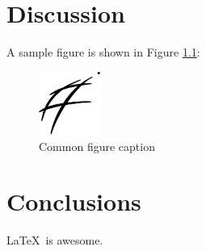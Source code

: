 \chapter{Discussion}

A sample figure is shown in Figure \ref{fig:sample_figure}:

\begin{figure}
	\centering
	\includegraphics[width=2cm]{logos/EnvSci}
	\caption{Common figure caption}
	\label{fig:sample_figure}
\end{figure}

\chapter{Conclusions}

\LaTeX\ is awesome.